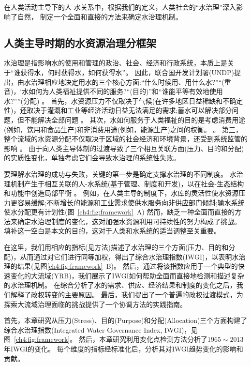 在人类活动主导下的人-水关系中，根据我们的定义，人类社会的“水治理”深入影响了自然，
制定一个全面和直接的方法来确定水治理机制。

\subsection{人类主导时期的水资源治理分框架}

水治理是指影响水的使用和管理的政治、社会、经济和行政系统，本质上是关于“谁获得水，何时获得水，如何获得水”。
因此，联合国开发计划署(UNDP)提出，由水治理相应地决定用水的三个核心方面:“什么时候用、用什么水?”“(重音)，‘水如何为人类福祉提供不同的服务?“(目的)”和“谁能平等有效地使用水?””(分配)
\cite{undpwatergovernancefacility2016}。
首先，水资源压力不仅取决于气候(在许多地区日益稀缺和不确定性)，还取决于灌溉和工业等经济活动日益无法满足的需求;蓄水可以解决部分问题，但不能解决全部问题
\cite{qin2019,wada2014,huang2021}。
其次，水如何服务于人类福祉的目的是考虑消费用途(例如，饮用和食品生产)和非消费用途(例如，能源生产)之间的权衡。
\cite{liu2017,florke2018,jaeger2019}。
第三，整个流域的水资源分配不仅取决于区域的社会经济和环境背景，还受到系统监管的影响
\cite{schmandt2021,speed2013}。
由于向人类主导体制的过渡导致了三个相互关联方面(压力、目的和分配)的实质性变化，单独考虑它们会导致水治理的系统性失败。

要理解水治理的成功与失败，关键的第一步是确定支撑水治理的不同制度。
水治理机制产生于相互关联的人-水系统(基于管理、制度和开发)，以在社会-生态结构和功能中创造局部平衡
\cite{falkenmark2021,bressers2013,loch2020}。
例如，在人类主导的制度下，水库的灵活性使水资源压力更容易缓解;不断增长的能源和工业需求使供水服务向非供应部门倾斜;输水系统使水分配更有计划性(图~\ref{ch4:fig:framework}~A)
然而，缺乏一种全面而直接的方法来确定水治理制度的变化，这对加强水资源利用可持续性的努力构成了挑战。
填补这一空白是本文的目的，这对于人类和水系统的适当调整至关重要。

在这里，我们用相应的指标(见方法)描述了水治理的三个方面(压力、目的和分配)，从而通过对它们进行同等加权，得出了综合水治理指数(IWGI)，以表明水治理的结果(见图\ref{ch4:fig:framework}~B)。
然后，通过将该指数应用于一个典型的快速变化的大流域(YRB)，我们展示了IWGI如何帮助全面而直接地检测和描述复杂的水治理机制。
在综合分析了水的需求、供应、经济结果和制度的变化之后，我们解释了政权转变的主要原因。
最后，我们提出了一个普遍的政权过渡模式，为探索大流域治理面临的挑战提供了一个协调方法的实践指南。


首先，本章研究从压力(Stress)、目的(Purpose)和分配(Allocation)三个方面构建了综合水治理指数(Integrated Water Governance Index, IWGI)，见图~\ref{ch4:fig:framework}。
然后，本章研究利用变化点检测方法分析了$1965\sim2013$年IWGI的变化。
每个维度的指标经标准化后，分析其对IWGI趋势变化的影响和贡献。


